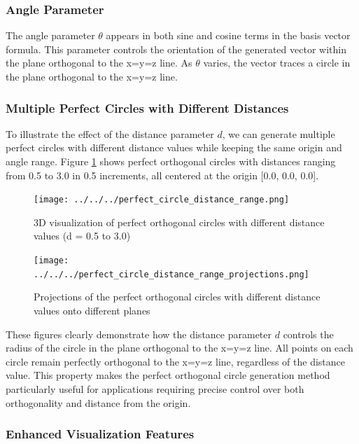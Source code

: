 \subsubsection{Angle Parameter}

The angle parameter $\theta$ appears in both sine and cosine terms in the basis vector formula. This parameter controls the orientation of the generated vector within the plane orthogonal to the x=y=z line. As $\theta$ varies, the vector traces a circle in the plane orthogonal to the x=y=z line.

\subsubsection{Multiple Perfect Circles with Different Distances}

To illustrate the effect of the distance parameter $d$, we can generate multiple perfect circles with different distance values while keeping the same origin and angle range. Figure \ref{fig:perfect_circle_distance_range} shows perfect orthogonal circles with distances ranging from 0.5 to 3.0 in 0.5 increments, all centered at the origin [0.0, 0.0, 0.0].

\begin{figure}[H]
    \centering
    \texttt{[image: ../../../perfect\_circle\_distance\_range.png]}
    \caption{3D visualization of perfect orthogonal circles with different distance values (d = 0.5 to 3.0)}
    \label{fig:perfect_circle_distance_range}
\end{figure}

\begin{figure}[H]
    \centering
    \texttt{[image: ../../../perfect\_circle\_distance\_range\_projections.png]}
    \caption{Projections of the perfect orthogonal circles with different distance values onto different planes}
    \label{fig:perfect_circle_distance_range_projections}
\end{figure}

These figures clearly demonstrate how the distance parameter $d$ controls the radius of the circle in the plane orthogonal to the x=y=z line. All points on each circle remain perfectly orthogonal to the x=y=z line, regardless of the distance value. This property makes the perfect orthogonal circle generation method particularly useful for applications requiring precise control over both orthogonality and distance from the origin.

\subsubsection{Enhanced Visualization Features}

